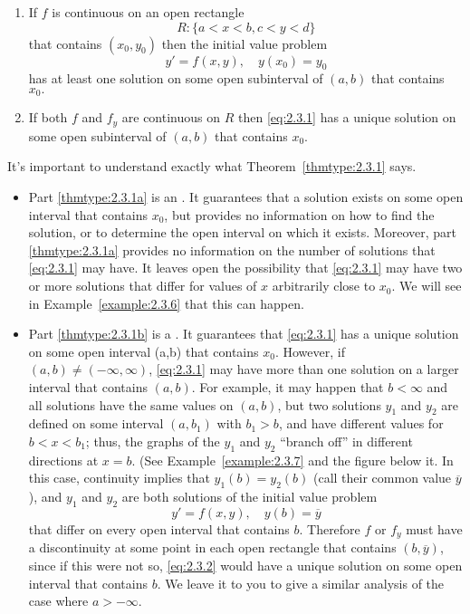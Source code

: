 \documentclass{ximera}
\begin{document}
\begin{theorem}\label{thmtype:2.3.1} 
\begin{enumerate}
\item\label{thmtype:2.3.1a}
 If  $f$ is continuous
on an open rectangle
$$
R:  \{ a < x < b, c < y < d \}
$$
 that contains $(x_0,y_0)$
then  the initial value problem
\begin{equation} \label{eq:2.3.1}
y'=f(x,y), \quad y(x_0)=y_0
\end{equation}
 has at least one solution  on some open subinterval
of  $(a,b)$ that contains $x_0.$

\item\label{thmtype:2.3.1b}
 If  both $f$ and  $f_y$ are
 continuous on $R$ then \eqref{eq:2.3.1} has a unique
solution on some open subinterval  of $(a,b)$ that contains $x_0$.
\end{enumerate}
\end{theorem}


It's important to understand exactly what Theorem~\ref{thmtype:2.3.1}
says.

\begin{itemize}
\item
Part \ref{thmtype:2.3.1a} is an . It guarantees that a
solution exists on some open interval that contains $x_0$, but provides
no information on how to find the solution, or to determine the open
interval on which it exists. Moreover, part \ref{thmtype:2.3.1a} provides no
information on the number of solutions that \eqref{eq:2.3.1} may have. It
leaves open the possibility that \eqref{eq:2.3.1} may have two or more
solutions that differ for values of $x$ arbitrarily close to $x_0$. We
will see in Example~\ref{example:2.3.6} that this can happen.
\item
Part \ref{thmtype:2.3.1b} is a . It guarantees that
\eqref{eq:2.3.1} has a unique solution on some open interval (a,b) that
contains $x_0$. However, if $(a,b)\neq(-\infty,\infty)$,
\eqref{eq:2.3.1} may have more than one solution on a larger interval
that contains $(a,b)$. For example, it may happen that $b<\infty$ and all
solutions have the same values on $(a,b)$, but two solutions $y_1$ and
$y_2$ are defined on some interval $(a,b_1)$ with $b_1>b$, and have
different values for $b<x<b_1$;   thus, the graphs of the $y_1$ and
$y_2$ ``branch off'' in different directions at $x=b$. (See
Example~\ref{example:2.3.7} and %
the figure below it.  In this case,
continuity implies that $y_1(b)=y_2(b)$ (call their common value
$\overline y$), and  $y_1$ and $y_2$ are both solutions of the initial
value problem
\begin{equation} \label{eq:2.3.2}
y'=f(x,y),\quad y(b)=\overline y
\end{equation}
that differ on every open interval that contains $b$. Therefore
$f$ or $f_y$ must have a discontinuity at some point in each open
rectangle that contains $(b,\overline y)$, since if this were not so,
\eqref{eq:2.3.2} would have a unique solution on some open interval
that contains $b$. We leave it to you to give a similar analysis of the
case where $a>-\infty$.
 \end{itemize}
\end{document}
